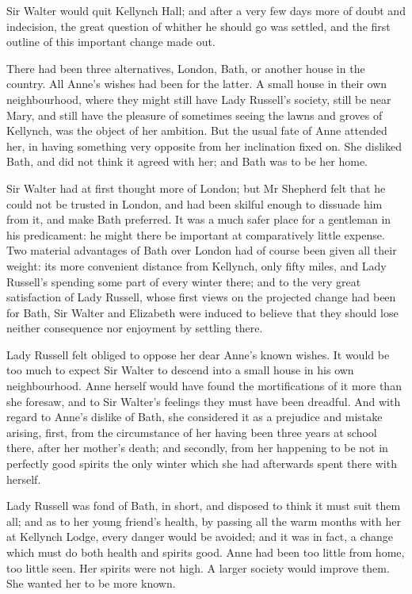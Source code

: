 Sir Walter would quit Kellynch Hall; and after a very few days more of doubt and indecision, the great question of whither he should go was settled, and the first outline of this important change made out.

There had been three alternatives, London, Bath, or another house in the country. All Anne's wishes had been for the latter. A small house in their own neighbourhood, where they might still have Lady Russell's society, still be near Mary, and still have the pleasure of sometimes seeing the lawns and groves of Kellynch, was the object of her ambition. But the usual fate of Anne attended her, in having something very opposite from her inclination fixed on. She disliked Bath, and did not think it agreed with her; and Bath was to be her home.

Sir Walter had at first thought more of London; but Mr Shepherd felt that he could not be trusted in London, and had been skilful enough to dissuade him from it, and make Bath preferred. It was a much safer place for a gentleman in his predicament: he might there be important at comparatively little expense. Two material advantages of Bath over London had of course been given all their weight: its more convenient distance from Kellynch, only fifty miles, and Lady Russell's spending some part of every winter there; and to the very great satisfaction of Lady Russell, whose first views on the projected change had been for Bath, Sir Walter and Elizabeth were induced to believe that they should lose neither consequence nor enjoyment by settling there.

Lady Russell felt obliged to oppose her dear Anne's known wishes. It would be too much to expect Sir Walter to descend into a small house in his own neighbourhood. Anne herself would have found the mortifications of it more than she foresaw, and to Sir Walter's feelings they must have been dreadful. And with regard to Anne's dislike of Bath, she considered it as a prejudice and mistake arising, first, from the circumstance of her having been three years at school there, after her mother's death; and secondly, from her happening to be not in perfectly good spirits the only winter which she had afterwards spent there with herself.

Lady Russell was fond of Bath, in short, and disposed to think it must suit them all; and as to her young friend's health, by passing all the warm months with her at Kellynch Lodge, every danger would be avoided; and it was in fact, a change which must do both health and spirits good. Anne had been too little from home, too little seen. Her spirits were not high. A larger society would improve them. She wanted her to be more known.

